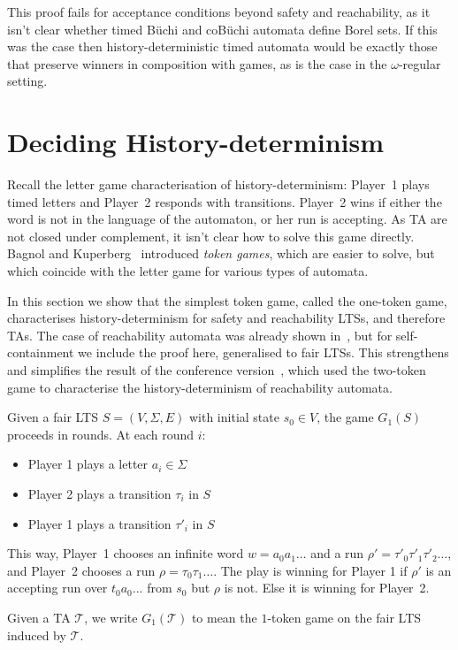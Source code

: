 \documentclass[10pt,a4paper]{amsart}
\theoremstyle{definition}
\numberwithin{equation}{section}
\newcommand{\T}{\mathcal{T}}
\newcommand{\lts}{S}
\begin{document}
This proof fails for acceptance conditions beyond safety and reachability, as it isn't clear whether timed B\"uchi and coB\"uchi automata define Borel sets. If this was the case then history-deterministic timed automata would be exactly those that preserve winners in composition with games, as is the case in the $\omega$-regular setting.
	
	\section{Deciding History-determinism}
	\label{sec_decision}
	\label{sec:decision}


Recall the letter game characterisation of history-determinism: Player~1 plays timed letters and Player~2 responds with transitions.  Player~2 wins if either the word is not in the language of the automaton, or her run is accepting.
As TA are not closed under complement, it isn't clear how to solve this game directly. Bagnol and Kuperberg~\cite{BK18} introduced  \textit{token games}, which are easier to solve, but which coincide with the letter game for various types of automata\cite{BK18,BKLS20,BL22}.

In this section we show that the simplest token game, called the one-token game, characterises history-determinism for safety and reachability LTSs, and therefore TAs. The case of reachability automata was already shown in~\cite{BL22}, but for self-containment we include the proof here, generalised to fair LTSs. This strengthens and simplifies the result of the conference version~\cite{HLT2022}, which used the two-token game to characterise the history-determinism of reachability automata.


\begin{definition}
Given a fair LTS 
$\lts=(V,\Sigma,E)$ with initial state $s_0\in V$, the game $G_1(\lts)$ proceeds in rounds. At each round $i$:
\begin{itemize}
\item Player 1 plays a letter $a_i\in\Sigma$
\item Player 2 plays a transition $\tau_i$ in $\lts$
\item Player 1 plays a transition $\tau'_{i}$ in $\lts$
\end{itemize}
This way, Player~1 chooses an infinite word 
$w=a_0a_1\ldots$ and a run $\rho'=\tau'_{0}\tau'_{1}\tau'_{2}\dots$,
and Player~2 chooses a run $\rho=\tau_0\tau_1\dots$.
The play is winning for Player 1 if $\rho'$ is an accepting run over $t_0a_0...$ from $s_0$ but $\rho$ is not. Else it is winning for Player~2.

Given a TA $\T$, we write $G_1(\T)$ to mean the $1$-token game on the fair LTS induced by $\T$.
\end{definition}
\end{document}
